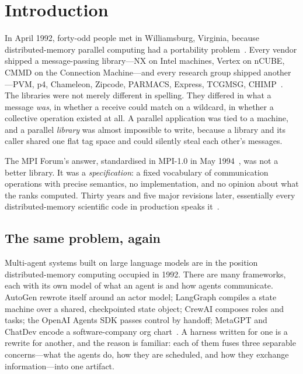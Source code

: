 \section{Introduction}

In April 1992, forty-odd people met in Williamsburg, Virginia, because
distributed-memory parallel computing had a portability
problem~\cite{dongarra1993mpi1draft,walker1992williamsburg}. Every vendor
shipped a message-passing library---NX on Intel machines, Vertex on nCUBE,
CMMD on the Connection Machine---and every research group shipped
another---PVM, p4, Chameleon, Zipcode, PARMACS, Express,
TCGMSG, CHIMP~\cite{geist1994pvm,butler1994p4,skjellum1994zipcode,bomans1990parmacs}.
The libraries were not merely different in spelling. They differed in what a
message \emph{was}, in whether a receive could match on a wildcard, in
whether a collective operation existed at all. A parallel application was
tied to a machine, and a parallel \emph{library} was almost impossible to
write, because a library and its caller shared one flat tag space and could
silently steal each other's messages.

The MPI Forum's answer, standardised in MPI-1.0 in May
1994~\cite{mpi-forum-1994,dongarra1996cacm}, was not a better library. It
was a \emph{specification}: a fixed vocabulary of communication operations
with precise semantics, no implementation, and no opinion about what the
ranks computed. Thirty years and five major revisions later, essentially
every distributed-memory scientific code in production speaks
it~\cite{bernholdt2020survey,gropp2001learning}.

\subsection{The same problem, again}

Multi-agent systems built on large language models are in the position
distributed-memory computing occupied in 1992. There are many frameworks,
each with its own model of what an agent is and how agents
communicate. AutoGen rewrote itself around an actor model; LangGraph
compiles a state machine over a shared, checkpointed state object; CrewAI
composes roles and tasks; the OpenAI Agents SDK passes control by handoff;
MetaGPT and ChatDev encode a software-company org
chart~\cite{microsoft2025autogen04,langchaindocs2026persistence,crewaidocs2026,openaiagentsdocs2026handoffs,hong2024metagpt,chatdevissue2023}.
A harness written for one is a rewrite for another, and the reason is
familiar: each of them fuses three separable concerns---what the agents do,
how they are scheduled, and how they exchange information---into one
artifact.

